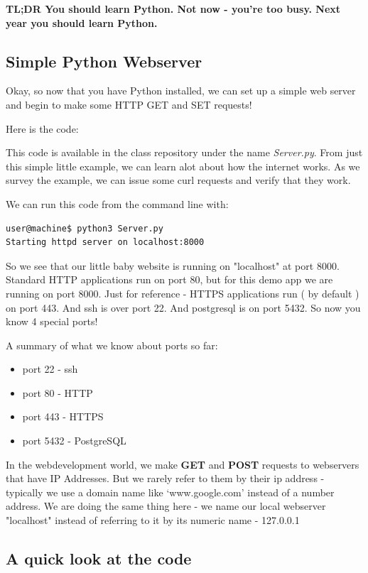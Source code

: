 \documentclass[10pt]{article}
\begin{document}
\begin{center}
\textbf{TL;DR You should learn Python. Not now - you're too busy. Next year you should learn Python.}
\end{center}

\subsection{Simple Python Webserver}
Okay, so now that you have Python installed, we can set up a simple web server and begin to make some HTTP GET and SET requests!

Here is the code:


This code is available in the class repository under the name \textit{Server.py}. From just this simple little example, we can learn alot about how the internet works. As we survey the example, we can issue some curl requests and verify that they work.

We can run this code from the command line with:

\begin{lstlisting}
user@machine$ python3 Server.py
Starting httpd server on localhost:8000
\end{lstlisting}

So we see that our little baby website is running on "localhost" at port 8000. Standard HTTP applications run on port 80, but for this demo app we are running on port 8000. Just for reference - HTTPS applications run ( by default ) on port 443. And ssh is over port 22. And postgresql is on port 5432. So now you know 4 special ports!

A summary of what we know about ports so far:
\begin{itemize}
\item port 22 - ssh
\item port 80 - HTTP
\item port 443 - HTTPS
\item port 5432 - PostgreSQL
\end{itemize}

In the webdevelopment world, we make \textbf{GET} and \textbf{POST} requests to webservers that have IP Addresses. But we rarely refer to them by their ip address - typically we use a domain name like `www.google.com' instead of a number address. We are doing the same thing here - we name our local webserver "localhost" instead of referring to it by its numeric name - 127.0.0.1 

\subsection{A quick look at the code} \label{samplehtml}
\end{document}

